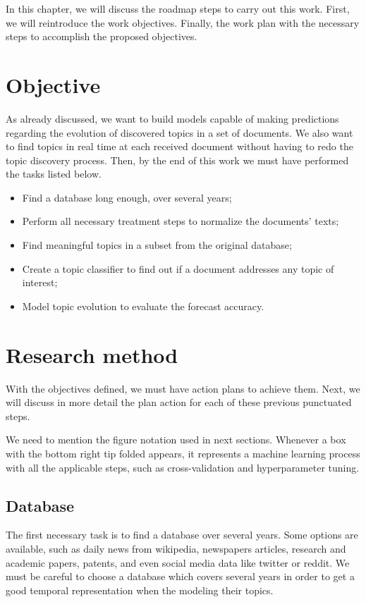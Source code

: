 In this chapter, we will discuss the roadmap steps to carry out this work. First, we will reintroduce the work objectives. Finally, the work plan with the necessary steps to accomplish the proposed objectives.

\section{Objective}

As already discussed, we want to build models capable of making predictions regarding the evolution of discovered topics in a set of documents. We also want to find topics in real time at each received document without having to redo the topic discovery process. Then, by the end of this work we must have performed the tasks listed below.

\begin{itemize}
	\item Find a database long enough, over several years;
	\item Perform all necessary treatment steps to normalize the documents' texts;
	\item Find meaningful topics in a subset from the original database;
	\item Create a topic classifier to find out if a document addresses any topic of interest;
	\item Model topic evolution to evaluate the forecast accuracy.
\end{itemize}

\section{Research method}

With the objectives defined, we must have action plans to achieve them. Next, we will discuss in more detail the plan action for each of these previous punctuated steps.

We need to mention the figure notation used in next sections. Whenever a box with the bottom right tip folded appears, it represents a machine learning process with all the applicable steps, such as cross-validation and hyperparameter tuning.

\subsection{Database}

The first necessary task is to find a database over several years. 
Some options are available, such as daily news from wikipedia, newspapers articles, research and academic papers, patents, and even social media data like twitter or reddit.
We must be careful to choose a database which covers several years in order to get a good temporal representation when the modeling their topics.

